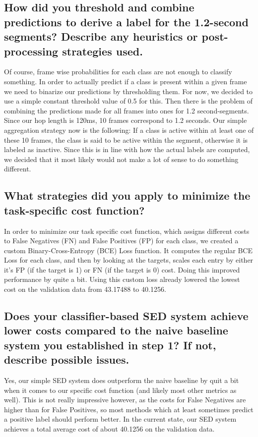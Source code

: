 \subsection{How did you threshold and combine predictions to derive a label for the 1.2-second segments? Describe any heuristics or post-processing strategies used.}
\label{sec:Build:a}
Of course, frame wise probabilities for each class are not enough to classify something. In order to actually predict if a class is present within a given frame we need to binarize our predictions by thresholding them. For now, we decided to use a simple constant threshold value of 0.5 for this.
\newline
Then there is the problem of combining the predictions made for all frames into ones for 1.2 second-segments. Since our hop length is 120ms, 10 frames correspond to 1.2 seconds. Our simple aggregation strategy now is the following: If a class is active within at least one of these 10 frames, the class is said to be active within the segment, otherwise it is labeled as inactive. Since this is in line with how the actual labels are computed, we decided that it most likely would not make a lot of sense to do something different.


\subsection{What strategies did you apply to minimize the task-specific cost function?}
\label{sec:Build:b}
In order to minimize our task specific cost function, which assigns different costs to False Negatives (FN) and False Positives (FP) for each class, we created a custom Binary-Cross-Entropy (BCE) Loss function. It computes the regular BCE Loss for each class, and then by looking at the targets, scales each entry by either it's FP (if the target is 1) or FN (if the target is 0) cost. Doing this improved performance by quite a bit.
\newline
Using this custom loss already lowered the lowest cost on the validation data from 43.17488 to 40.1256.




\subsection{Does your classifier-based SED system achieve lower costs compared to the naive baseline system you established in step 1? If not, describe possible issues.}
\label{sec:Build:c}
Yes, our simple SED system does outperform the naive baseline by quit a bit when it comes to our specific cost function (and likely most other metrics as well). This is not really impressive however, as the costs for False Negatives are higher than for False Positives, so most methods which at least sometimes predict a positive label should perform better.
\newline
In the current state, our SED system achieves a total average cost of about 40.1256 on the validation data.
